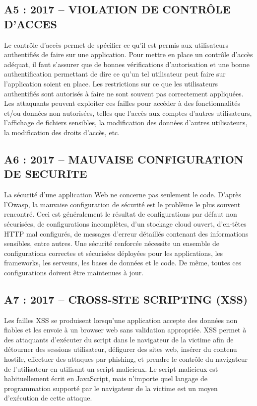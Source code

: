 \subsection{A5 : 2017 – VIOLATION DE CONTRÔLE D’ACCES}
Le contrôle d’accès permet de spécifier ce qu’il est permis aux utilisateurs authentifiés de faire sur une application. Pour mettre en place un contrôle d’accès adéquat, il faut s’assurer que de bonnes vérifications d’autorisation et une bonne authentification permettant de dire ce qu’un tel utilisateur peut faire sur l’application soient en place.
Les restrictions sur ce que les utilisateurs authentifiés sont autorisés à faire ne sont souvent pas correctement appliquées. Les attaquants peuvent exploiter ces failles pour accéder à des fonctionnalités et/ou données non autorisées, telles que l'accès aux comptes d'autres utilisateurs, l'affichage de fichiers sensibles, la modification des données d'autres utilisateurs, la modification des droits d'accès, etc.
\subsection{A6 : 2017 – MAUVAISE CONFIGURATION DE SECURITE}
La sécurité d’une application Web ne concerne pas seulement le code. D’après l’Owasp, la mauvaise configuration de sécurité est le problème le plus souvent rencontré. Ceci est généralement le résultat de configurations par défaut non sécurisées, de configurations incomplètes, d'un stockage cloud ouvert, d'en-têtes HTTP mal configurés, de messages d'erreur détaillés contenant des informations sensibles, entre autres. Une sécurité renforcée nécessite un ensemble de configurations correctes et sécurisées déployées pour les applications, les frameworks, les serveurs, les bases de données et le code. De même, toutes ces configurations doivent être maintenues à jour.
\subsection{A7 : 2017 – CROSS-SITE SCRIPTING (XSS)}
Les failles XSS se produisent lorsqu'une application accepte des données non fiables et les envoie à un browser web sans validation appropriée. XSS permet à des attaquants d'exécuter du script dans le navigateur de la victime afin de détourner des sessions utilisateur, défigurer des sites web, insérer du contenu hostile, effectuer des attaques par phishing, et prendre le contrôle du navigateur de l'utilisateur en utilisant un script malicieux. Le script malicieux est habituellement écrit en JavaScript, mais n'importe quel langage de programmation supporté par le navigateur de la victime est un moyen d’exécution de cette attaque.
